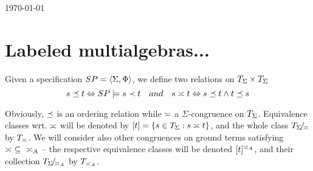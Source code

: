 \documentclass[10pt]{article}
\begin{document}
 

\hfill\today
% 
\section{Labeled multialgebras...}

\begin{Definition}
Given a specification $SP=\langle\Sigma,\Phi\rangle$, we define two relations on
$T_{\Sigma}\times T_{\Sigma}$ \vspace*{-1ex}
\[ s\incleq t \iff SP\models s\prec t\ \ \  and\ \ \ 
   s\seteq t\iff s\incleq t\land t\incleq s \vspace*{-1ex} \]
\end{Definition}
Obviously, $\preceq$ is an ordering relation while $\asymp$ a
$\Sigma$-congruence on $T_{\Sigma}$. Equivalence classes wrt. $\asymp$ will be
denoted by $[t]=\{s\in T_{\Sigma}:s\asymp t\}$, and the whole class
$T_{\Sigma}\!{\textstyle /}\!_{\asymp}$ by $T_{\asymp}$. We will consider also other congruences on
ground terms satisfying $\asymp\ \subseteq\ {\asymp_{A}}$ -- the respective equivalence
classes will be denoted $[t]^{\asymp_{A}}$, and their collection
$T_{\Sigma}\!{\textstyle /}\!_{{\asymp_{A}}}$ by $T_{{\asymp_{A}}}$.
\end{document}
